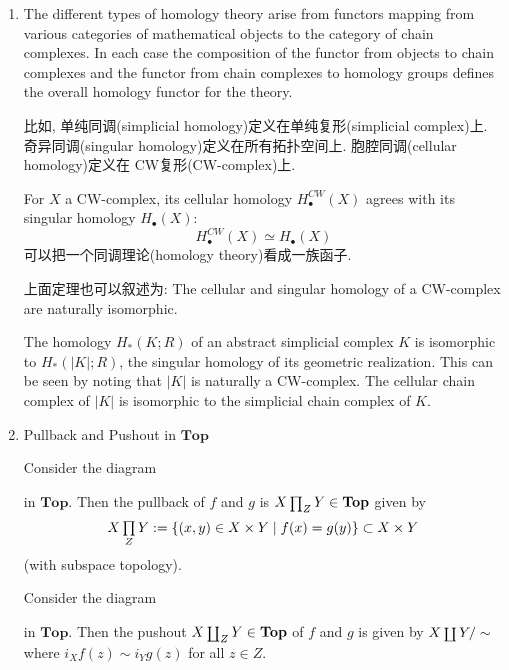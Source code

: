 \documentclass[UTF8]{ctexart}
\DeclareMathOperator{\pullback}{\mathsmaller{\prod}}
\DeclareMathOperator{\pushout}{\mathsmaller{\coprod}}
\newcommand{\Top}{\mathbf{Top}}
\begin{document}

\noindent\makebox[\linewidth]{\rule{\paperwidth}{0.4pt}}

\begin{enumerate}
\item The different types of homology theory arise from functors mapping from various categories of mathematical objects to the category of chain complexes. In each case the composition of the functor from objects to chain complexes and the functor from chain complexes to homology groups defines the overall homology functor for the theory.\parencite{types_of_homology}

比如, 单纯同调(simplicial homology)定义在单纯复形(simplicial complex)上. 奇异同调(singular homology)定义在所有拓扑空间上. 胞腔同调(cellular homology)定义在 CW复形(CW-complex)上.

For $X$ a CW-complex, its cellular homology $H^{CW}_\bullet(X)$ agrees with its singular homology $H_\bullet(X)$:
\[
H^{CW}_\bullet(X)\simeq H_\bullet(X)
\]
可以把一个同调理论(homology theory)看成一族函子.

上面定理也可以叙述为: The cellular and singular homology of a CW-complex are naturally isomorphic.

The homology $H_\ast(K;R)$ of an abstract simplicial complex $K$ is isomorphic to $H_\ast(\left|K\right|;R)$, the singular homology of its geometric realization. This can be seen by noting that $\left|K\right|$ is naturally a CW-complex. The cellular chain complex of $\left|K\right|$ is isomorphic to the simplicial chain complex of $K$.\parencite[p.8]{kirklecture}

\item Pullback and Pushout in $\Top$\parencite{algebraic_topology_notes_of_the_lecture}

Consider the diagram
\begin{center}
\end{center}
in $\Top$. Then the pullback of $f$ and $g$ is $X \pullback_Z Y \in \Top$ given by
\[
X \pullback_{Z} Y := \{(x,y) \in X \times Y \mid f(x) = g(y)\} \subset X \times Y
\]
(with subspace topology).

Consider the diagram
\begin{center}
\end{center}
in $\Top$. Then the pushout $X \pushout_Z Y\in \Top$ of $f$ and $g$ is given by $X\pushout Y/\sim$ where $i_X f(z) \sim i_Y g(z)$ for all $z \in Z$.


\end{enumerate}
\end{document}
